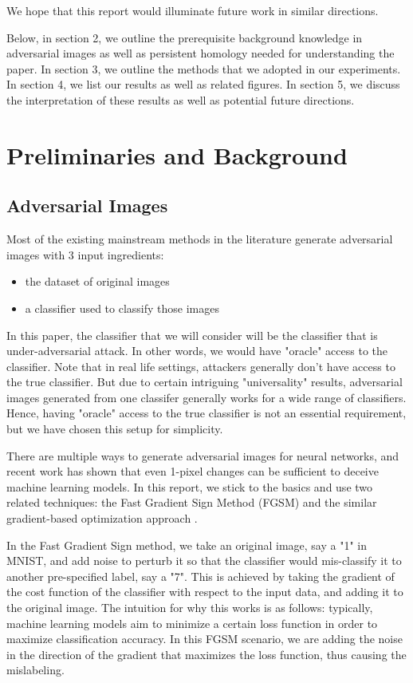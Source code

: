 \documentclass[twoside,twocolumn]{article}
\begin{document}
We hope that this report would illuminate future work in similar directions. 

Below, in section 2, we outline the prerequisite background knowledge in adversarial images as well as persistent homology needed for understanding the paper. In section 3, we outline the methods that we adopted in our experiments. In section 4, we list our results as well as related figures. In section 5, we discuss the interpretation of these results as well as potential future directions. 


\section{Preliminaries and Background}

\subsection{Adversarial Images}

Most of the existing mainstream methods in the literature generate adversarial images with 3 input ingredients: 
\begin{itemize}
    \item the dataset of original images
    \item a classifier used to classify those images
\end{itemize}
In this paper, the classifier that we will consider will be the classifier that is under-adversarial attack. In other words, we would have "oracle" access to the classifier. Note that in real life settings, attackers generally don't have access to the true classifier. But due to certain intriguing "universality" results, adversarial images generated from one classifer generally works for a wide range of classifiers. Hence, having "oracle" access to the true classifier is not an essential requirement, but we have chosen this setup for simplicity. 

There are multiple ways to generate adversarial images for neural networks, and recent work has shown that even 1-pixel changes can be sufficient to deceive machine learning models. In this report, we stick to the basics and use two related techniques: the Fast Gradient Sign Method (FGSM) \cite{goodfellow2014} and the similar gradient-based optimization approach \cite{szegedy2013}.

In the Fast Gradient Sign method, we take an original image, say a "1" in MNIST, and add noise to perturb it so that the classifier would mis-classify it to another pre-specified label, say a "7". This is achieved by taking the gradient of the cost function of the classifier with respect to the input data, and adding it to the original image. The intuition for why this works is as follows: typically, machine learning models aim to minimize a certain loss function in order to maximize classification accuracy. In this FGSM scenario, we are adding the noise in the direction of the gradient that maximizes the loss function, thus causing the mislabeling. 
\end{document}
